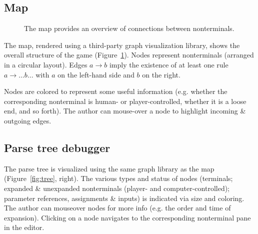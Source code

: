 \documentclass{acm_proc_article-sp}
\begin{document}
\subsection{Map}

\begin{figure}
\caption{
\label{fig:map}
The map provides an overview of connections between nonterminals.
}
\end{figure}

The map, rendered using a third-party graph visualization library,
shows the overall structure of the game (Figure~\ref{fig:map}).
Nodes represent nonterminals (arranged in a circular layout).
Edges $a \to b$ imply the existence of at least one rule $a \to \ldots b \ldots$
with $a$ on the left-hand side and $b$ on the right.

Nodes are colored to represent some useful information
(e.g. whether the corresponding nonterminal is human- or player-controlled,
whether it is a loose end, and so forth).
The author can mouse-over a node to highlight incoming \& outgoing edges.

\subsection{Parse tree debugger}

The parse tree is visualized using the same graph library as the map (Figure~\ref{fig:tree}, right).
The various types and status of nodes (terminals; expanded \& unexpanded nonterminals (player- and computer-controlled); parameter references, assignments \& inputs) is indicated via size and coloring.
The author can mouseover nodes for more info (e.g. the order and time of expansion).
Clicking on a node navigates to the corresponding nonterminal pane in the editor.
\end{document}
